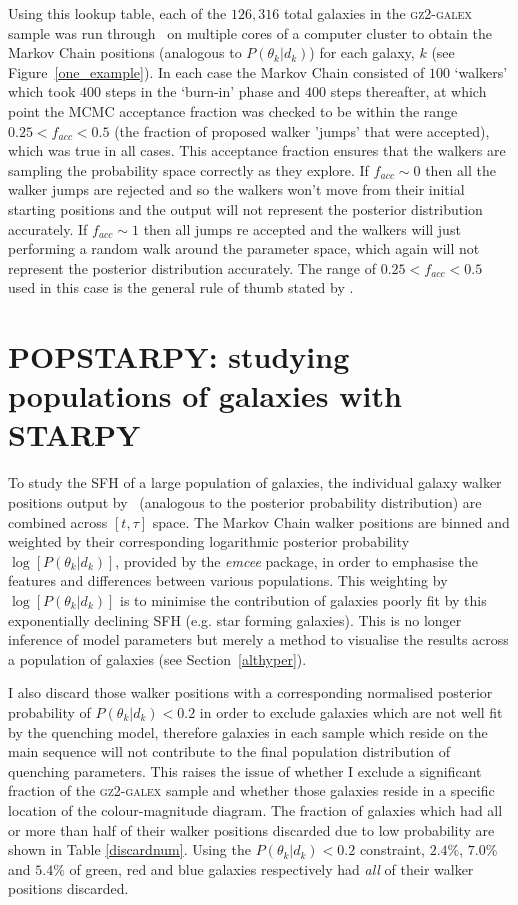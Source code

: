 Using this lookup table, each of the $126,316$ total galaxies in the \textsc{gz2-galex} sample was run through \starpy ~on multiple cores of a computer cluster to obtain the Markov Chain positions (analogous to $P(\theta_k|d_k)$) for each galaxy, $k$ (see Figure~\ref{one_example}). In each case the Markov Chain consisted of $100$ `walkers' which took $400$ steps in the `burn-in' phase and $400$ steps thereafter, at which point the MCMC acceptance fraction was checked to be within the range $0.25 < f_{acc} < 0.5$ (the fraction of proposed walker 'jumps' that were accepted), which was true in all cases. This acceptance fraction ensures that the walkers are sampling the probability space correctly as they explore. If $f_{acc} \sim 0$ then all the walker jumps are rejected and so the walkers won't move from their initial starting positions and the output will not represent the posterior distribution accurately. If $f_{acc} \sim 1$ then all jumps re accepted and the walkers will just performing a random walk around the parameter space, which again will not represent the posterior distribution accurately. The range of $0.25 < f_{acc} < 0.5$ used in this case is the general rule of thumb stated by \citet*{gelman96}.


\section{POPSTARPY: studying populations of galaxies with STARPY}\label{popstarpy}

To study the SFH of a large population of galaxies, the individual galaxy walker positions output by \starpy ~(analogous to the posterior probability distribution) are combined across $[t, \tau]$ space. The Markov Chain walker positions are binned and weighted by their corresponding logarithmic posterior probability $\log [P(\theta_k|d_k)]$, provided by the \emph{emcee} package, in order to emphasise the features and differences between various populations. This weighting by $\log [P(\theta_k|d_k)]$ is to minimise the contribution of galaxies poorly fit by this exponentially declining SFH (e.g. star forming galaxies). This is no longer inference of model parameters but merely a method to visualise the results across a population of galaxies (see Section~\ref{althyper}).

I also discard those walker positions with a corresponding normalised posterior probability of $P(\theta_k|d_k) < 0.2$ in order to exclude galaxies which are not well fit by the quenching model, therefore galaxies in each sample which reside on the main sequence will not contribute to the final population distribution of quenching parameters. This raises the issue of whether I exclude a significant fraction of the \textsc{gz2-galex} sample and whether those galaxies reside in a specific location of the colour-magnitude diagram. The fraction of galaxies which had all or more than half of their walker positions discarded due to low probability are shown in Table \ref{discardnum}. Using the $P(\theta_k|d_k) < 0.2$ constraint, $2.4\%$, $7.0\%$ and $5.4\%$ of green, red and blue galaxies respectively had \emph{all} of their walker positions discarded. 

